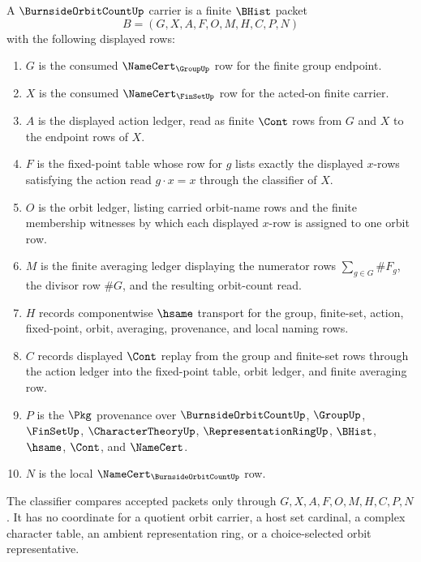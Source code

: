\begin{definition}
\label{def:burnside-orbit-count-carrier}
A $\BurnsideOrbitCountUp$ carrier is a finite $\BHist$ packet
$$
B=(G,X,A,F,O,M,H,C,P,N)
$$
with the following displayed rows:
\begin{enumerate}
\item $G$ is the consumed $\NameCert_{\GroupUp}$ row for the finite group endpoint.
\item $X$ is the consumed $\NameCert_{\FinSetUp}$ row for the acted-on finite carrier.
\item $A$ is the displayed action ledger, read as finite $\Cont$ rows from $G$ and $X$ to the endpoint rows of $X$.
\item $F$ is the fixed-point table whose row for $g$ lists exactly the displayed $x$-rows satisfying the action read $g\cdot x=x$ through the classifier of $X$.
\item $O$ is the orbit ledger, listing carried orbit-name rows and the finite membership witnesses by which each displayed $x$-row is assigned to one orbit row.
\item $M$ is the finite averaging ledger displaying the numerator rows $\sum_{g\in G}\#F_{g}$, the divisor row $\#G$, and the resulting orbit-count read.
\item $H$ records componentwise $\hsame$ transport for the group, finite-set, action, fixed-point, orbit, averaging, provenance, and local naming rows.
\item $C$ records displayed $\Cont$ replay from the group and finite-set rows through the action ledger into the fixed-point table, orbit ledger, and finite averaging row.
\item $P$ is the $\Pkg$ provenance over $\BurnsideOrbitCountUp$, $\GroupUp$, $\FinSetUp$, $\CharacterTheoryUp$, $\RepresentationRingUp$, $\BHist$, $\hsame$, $\Cont$, and $\NameCert$.
\item $N$ is the local $\NameCert_{\BurnsideOrbitCountUp}$ row.
\end{enumerate}
The classifier compares accepted packets only through $G,X,A,F,O,M,H,C,P,N$. It has no coordinate for a quotient orbit carrier, a host set cardinal, a complex character table, an ambient representation ring, or a choice-selected orbit representative.
\end{definition}

